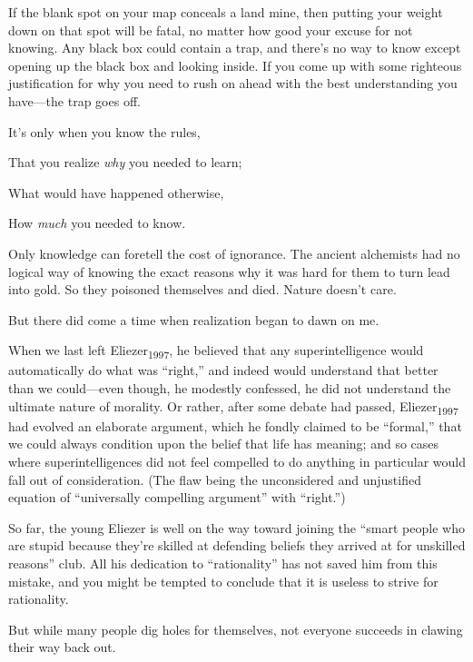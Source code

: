 {
 If the blank spot on your map conceals a land mine, then putting
your weight down on that spot will be fatal, no matter how good your
excuse for not knowing. Any black box could contain a trap, and
there's no way to know except opening up the black box
and looking inside. If you come up with some righteous justification
for why you need to rush on ahead with the best understanding you
have---the trap goes off.}

{
 It's only when you know the rules,}

{
 That you realize \textit{why} you needed to learn;}

{
 What would have happened otherwise,}

{
 How \textit{much} you needed to know.}

{
 Only knowledge can foretell the cost of ignorance. The ancient
alchemists had no logical way of knowing the exact reasons why it was
hard for them to turn lead into gold. So they poisoned themselves and
died. Nature doesn't care.}

{
 But there did come a time when realization began to dawn on me.}

\myendsectiontext


\bigskip


{
 When we last left Eliezer\textsubscript{1997}, he believed that
any superintelligence would automatically do what was
``right,'' and indeed would
understand that better than we could---even though, he modestly
confessed, he did not understand the ultimate nature of morality. Or
rather, after some debate had passed, Eliezer\textsubscript{1997} had
evolved an elaborate argument, which he fondly claimed to be
``formal,'' that we could always
condition upon the belief that life has meaning; and so cases where
superintelligences did not feel compelled to do anything in particular
would fall out of consideration. (The flaw being the unconsidered and
unjustified equation of ``universally compelling
argument'' with
``right.'') }

{
 So far, the young Eliezer is well on the way toward joining the
``smart people who are stupid because
they're skilled at defending beliefs they arrived at
for unskilled reasons'' club. All his dedication to
``rationality'' has not saved him
from this mistake, and you might be tempted to conclude that it is
useless to strive for rationality.}

{
 But while many people dig holes for themselves, not everyone
succeeds in clawing their way back out.}

